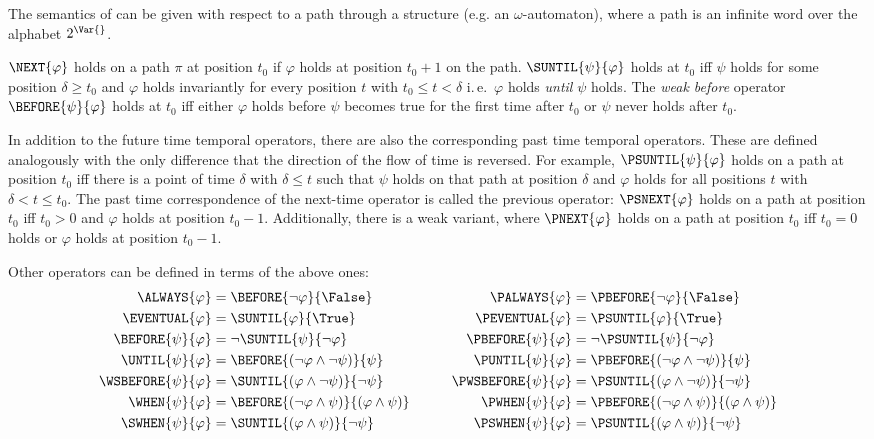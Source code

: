 \documentclass[submission,copyright,creativecommons]{eptcs}
\newcommand{\ie}{i.\,e.~}
\begin{document}
\noindent The semantics of \LTL{} can be given with respect to a path through a structure (e.g. an $\omega$-automaton), where a path is an infinite word over the alphabet $2^\Var{}$.

$\NEXT{\varphi}$ holds on a path $\pi$ at position $t_0$ if $\varphi$ holds at position $t_0+1$ on the path. $\SUNTIL{\psi}{\varphi}$ holds at $t_0$ iff $\psi$ holds for some position $\delta\geq t_0$ and $\varphi$ holds invariantly for every position $t$ with $t_0 \leq t < \delta$ \ie $\varphi$ holds \emph{until} $\psi$ holds. The \emph{weak before} operator $\BEFORE{\psi}{\varphi}$ holds at $t_0$ iff either $\varphi$ holds before $\psi$ becomes true for the first time after $t_0$ or $\psi$ never holds after $t_0$. 

In addition to the future time temporal operators, there are also the corresponding past time temporal operators. These are defined analogously with the only difference that the direction of the flow of time is reversed. For example, $\PSUNTIL{\psi}{\varphi}$ holds on a path at position $t_0$ iff there is a point of time $\delta$ with $\delta \leq t$ such that $\psi$ holds on that path at position $\delta$ and $\varphi$ holds for all positions $t$ with $\delta<t \leq t_0$. The past time correspondence of the next-time operator is called the previous operator: $\PSNEXT{\varphi}$ holds on a path at position $t_0$ iff $t_0>0$ and $\varphi$ holds at position $t_0-1$. Additionally, there is a weak variant, where $\PNEXT{\varphi}$ holds on a path at position $t_0$ iff $t_0=0$ holds or $\varphi$ holds at position $t_0-1$.   

Other operators can be defined in terms of the above ones:
\begin{alignat*}{2}
\ALWAYS{\varphi} & =\BEFORE{\neg \varphi}{\False}  & \qquad \PALWAYS{\varphi} & =\PBEFORE{\neg \varphi}{\False} \\
\EVENTUAL{\varphi} & =\SUNTIL{\varphi}{\True}  & \qquad \PEVENTUAL{\varphi} & =\PSUNTIL{\varphi}{\True} \\
\BEFORE{\psi}{\varphi} & =  \neg \SUNTIL{\psi}{\neg \varphi} & \qquad \PBEFORE{\psi}{\varphi} & =  \neg \PSUNTIL{\psi}{\neg \varphi} \\
\UNTIL{\psi}{\varphi} & =  \BEFORE {(\neg \varphi \wedge \neg \psi)}{\psi}  & \qquad \PUNTIL{\psi}{\varphi} & =  \PBEFORE {(\neg \varphi \wedge \neg \psi)}{\psi}\\
\WSBEFORE{\psi}{\varphi} & = \SUNTIL {(\varphi \wedge \neg \psi)}{\neg \psi}   & \qquad \PWSBEFORE{\psi}{\varphi} & = \PSUNTIL {(\varphi \wedge \neg \psi)}{\neg \psi} \\ 
\WHEN{\psi}{\varphi} & =\BEFORE{(\neg\varphi \wedge \psi)}{(\varphi \wedge \psi)}  & \qquad \PWHEN{\psi}{\varphi} & =\PBEFORE{(\neg\varphi \wedge \psi)}{(\varphi \wedge \psi)} \\
\SWHEN{\psi}{\varphi} & =\SUNTIL{(\varphi \wedge \psi)}{\neg \psi}  & \qquad \PSWHEN{\psi}{\varphi} & =\PSUNTIL{(\varphi \wedge \psi)}{\neg \psi} \\
\end{alignat*}
\end{document}
